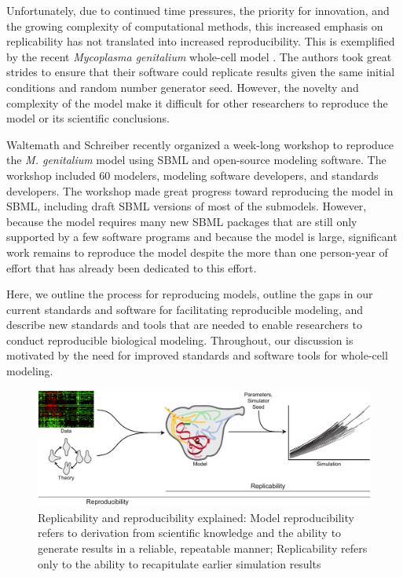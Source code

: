\documentclass[journal,transmag,twoside]{IEEEtran}
\begin{document}
Unfortunately, due to continued time pressures, the priority for innovation, and the growing complexity of computational methods, this increased emphasis on replicability has not translated into increased reproducibility. This is exemplified by the recent \textit{Mycoplasma genitalium} whole-cell model \cite{Karr2012}. The authors took great strides to ensure that their software could replicate results given the same initial conditions and random number generator seed. However, the novelty and complexity of the model make it difficult for other researchers to reproduce the model or its scientific conclusions.

Waltemath and Schreiber recently organized a week-long workshop to reproduce the \textit{M. genitalium} model using SBML and open-source modeling software. The workshop included 60 modelers, modeling software developers, and standards developers. The workshop made great progress toward reproducing the model in SBML, including draft SBML versions of most of the submodels. However, because the model requires many new SBML packages that are still only supported by a few software programs and because the model is large, significant work remains to reproduce the model despite the more than one person-year of effort that has already been dedicated to this effort.

Here, we outline the process for reproducing models, outline the gaps in our current standards and software for facilitating 
reproducible modeling, and describe new standards and tools that are needed to enable researchers to conduct reproducible
biological modeling. Throughout, our discussion is motivated by the need for improved standards and software tools for whole-cell modeling.

\begin{figure}[!t]
\centering
\includegraphics[width=\textwidth]{figure1/figure1}
\caption{Replicability and reproducibility explained: Model reproducibility refers to derivation from scientific knowledge and the ability to generate results in a reliable, repeatable manner;
Replicability refers only to the ability to recapitulate earlier simulation results}
\label{fig_repro_diagram}
\end{figure}
\end{document}
